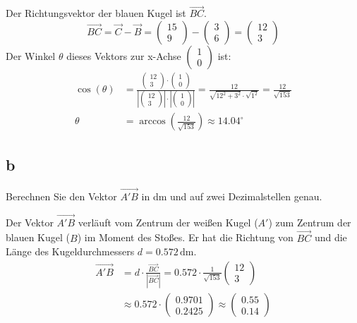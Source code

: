 Der Richtungsvektor der blauen Kugel ist \(\vec{BC}\).
\[
    \vec{BC} = \vec{C} - \vec{B} = \begin{pmatrix} 15 \\ 9 \end{pmatrix} - \begin{pmatrix} 3 \\ 6 \end{pmatrix} = \begin{pmatrix} 12 \\ 3 \end{pmatrix}
\]
Der Winkel \(\theta\) dieses Vektors zur x-Achse \(\begin{pmatrix} 1 \\ 0 \end{pmatrix}\) ist:
\begin{align*}
    \cos(\theta) & = \frac{\begin{pmatrix} 12 \\ 3 \end{pmatrix} \cdot \begin{pmatrix} 1 \\ 0 \end{pmatrix}}{|\begin{pmatrix} 12 \\ 3 \end{pmatrix}| \cdot |\begin{pmatrix} 1 \\ 0 \end{pmatrix}|} = \frac{12}{\sqrt{12^2 + 3^2} \cdot \sqrt{1^2}} = \frac{12}{\sqrt{153}} \\
    \theta       & = \arccos\left(\frac{12}{\sqrt{153}}\right) \approx 14.04^\circ
\end{align*}

\subsection{b}
Berechnen Sie den Vektor \(\vec{A'B}\) in dm und auf zwei Dezimalstellen genau.

Der Vektor \(\vec{A'B}\) verläuft vom Zentrum der weißen Kugel (\(A'\)) zum
Zentrum der blauen Kugel (\(B\)) im Moment des Stoßes. Er hat die Richtung von
\(\vec{BC}\) und die Länge des Kugeldurchmessers \(d = 0.572\,\text{dm}\).
\begin{align*}
    \vec{A'B} & = d \cdot \frac{\vec{BC}}{|\vec{BC}|} = 0.572 \cdot \frac{1}{\sqrt{153}}\begin{pmatrix} 12 \\ 3 \end{pmatrix}         \\
              & \approx 0.572 \cdot \begin{pmatrix} 0.9701 \\ 0.2425 \end{pmatrix} \approx \begin{pmatrix} 0.55 \\ 0.14 \end{pmatrix}
\end{align*}

